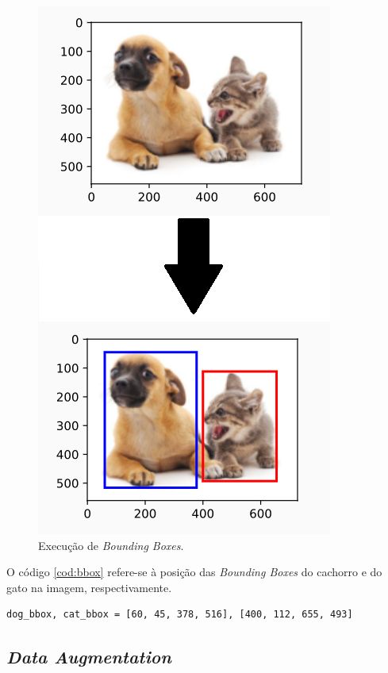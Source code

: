 \begin{figure}[htbp]
		\centering
		\includegraphics[scale=0.4]{figuras/MachineLearning/catDog.png}
		\caption{Execução de \textit{Bounding Boxes}.}
		\label{fig:boundingBox}
\end{figure}

O código \ref{cod:bbox} refere-se à posição das \textit{Bounding Boxes} do cachorro e do gato na imagem, respectivamente.

\begin{lstlisting}[caption=Posições de X e Y nas \textit{Bounding Boxes}, label=cod:bbox]
         dog_bbox, cat_bbox = [60, 45, 378, 516], [400, 112, 655, 493]
\end{lstlisting}


\subsection{\textit{Data Augmentation}}

